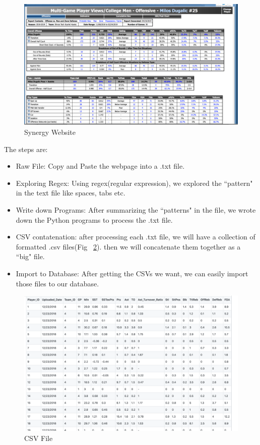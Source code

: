 \documentclass[conference]{IEEEtran}
\begin{document}
\begin{figure}[H]
  \begin{center}
    \includegraphics[scale=0.5]{Picture1.jpg} 
    \caption{Synergy Website}
    \label{Synergy Snapshot}
  \end{center}
\end{figure}
The steps are:
\begin{itemize}
\item Raw File: Copy and Paste the webpage into a .txt file.
\item Exploring Regex: Using regex(regular expression), we explored the ``pattern" in the text file like spaces, tabs etc.
\item Write down Programs: After summarizing the ``patterns" in the file, we wrote down the Python programs to process the .txt file.
\item CSV contatenation: after processing each .txt file, we will have a collection of formatted .csv files(Fig ~\ref{CSV Example}). then we will concatenate them together as a ``big" file.
\item Import to Database: After getting the CSVs we want, we can easily import those files to our database.
\end{itemize}


\begin{figure}[h!]   
  \begin{center}
    \includegraphics[scale=0.5]{Picture6.jpg}
    \caption{CSV File}
    \label{CSV Example}
  \end{center}
\end{figure}
\end{document}
